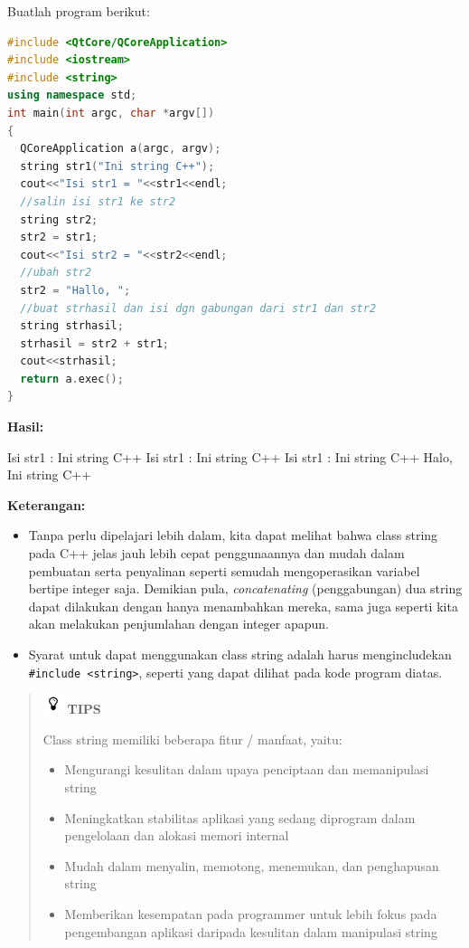 Buatlah program berikut:

\begin{lstlisting}[language=c++, caption=Pembuatan variabel string C++ penyalinan string dan
penggabungan string, label=contoh3-24]
#include <QtCore/QCoreApplication>
#include <iostream>
#include <string>
using namespace std;
int main(int argc, char *argv[])
{
  QCoreApplication a(argc, argv);
  string str1("Ini string C++");
  cout<<"Isi str1 = "<<str1<<endl;
  //salin isi str1 ke str2
  string str2;
  str2 = str1;
  cout<<"Isi str2 = "<<str2<<endl;
  //ubah str2
  str2 = "Hallo, ";
  //buat strhasil dan isi dgn gabungan dari str1 dan str2
  string strhasil;
  strhasil = str2 + str1;
  cout<<strhasil;
  return a.exec();
}
\end{lstlisting}

\textbf{Hasil:}

\begin{lcverbatim}
Isi str1 : Ini string C++
Isi str1 : Ini string C++
Isi str1 : Ini string C++
Halo, Ini string C++
\end{lcverbatim}

\textbf{Keterangan:}

\begin{itemize}

\item
  Tanpa perlu dipelajari lebih dalam, kita dapat melihat bahwa class
  string pada C++ jelas jauh lebih cepat penggunaannya dan mudah dalam
  pembuatan serta penyalinan seperti semudah mengoperasikan variabel
  bertipe integer saja. Demikian pula, \emph{concatenating}
  (penggabungan) dua string dapat dilakukan dengan hanya menambahkan
  mereka, sama juga seperti kita akan melakukan penjumlahan dengan
  integer apapun.
\item
  Syarat untuk dapat menggunakan class string adalah harus
  mengincludekan \texttt{\#include\ \textless{}string\textgreater{}},
  seperti yang dapat dilihat pada kode program diatas.
\end{itemize}
\begin{quotation}
\includegraphics{../manuscript/images/tips.png}	 \textbf{TIPS} 
	 
	 Class
	 string memiliki beberapa fitur / manfaat, yaitu: 
\begin{itemize}
	\item Mengurangi kesulitan dalam upaya penciptaan dan
	memanipulasi string
	\item Meningkatkan stabilitas aplikasi
	yang sedang diprogram dalam pengelolaan dan alokasi memori internal
	\item Mudah dalam menyalin, memotong, menemukan, dan
	penghapusan string
	\item Memberikan kesempatan pada
	programmer untuk lebih fokus pada pengembangan aplikasi daripada
	kesulitan dalam manipulasi string
\end{itemize}	 
	 
\end{quotation}


